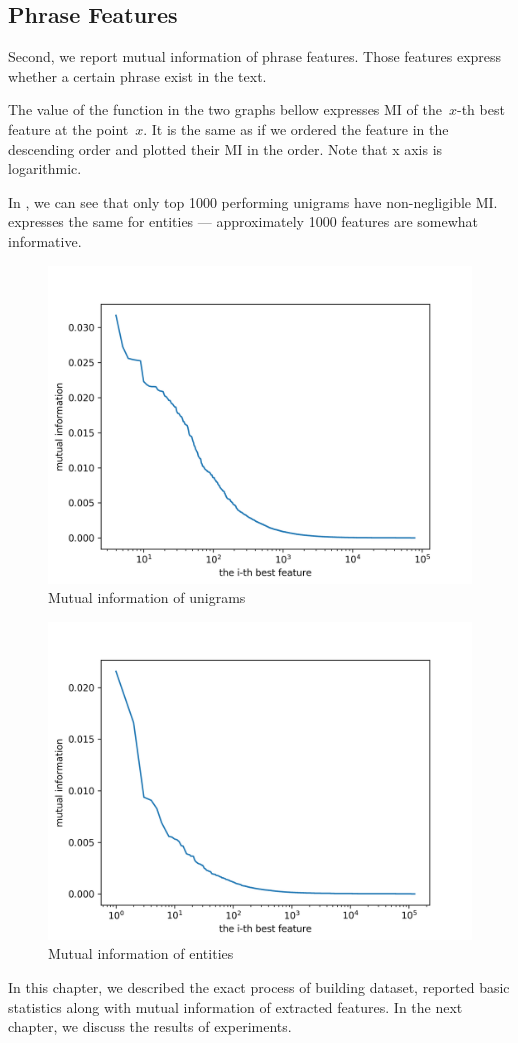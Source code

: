 \subsection{Phrase Features}

Second, we report mutual information of phrase features.
Those features express whether a certain phrase exist in the text.

The value of the function in the two graphs bellow expresses
MI of the~$x$-th best feature at the point~$x$.
It is the same as if we ordered the feature in the descending order
and plotted their MI in the order.
Note that x axis is logarithmic.

In ,
we can see that only top 1000 performing unigrams have non-negligible MI.
 expresses the same for entities
--- approximately 1000 features are somewhat informative.


\begin{figure}[ht]\centering
\includegraphics[width=130mm]{figures/unigrams.png}
\caption{Mutual information of unigrams}\label{fig:mi_unigrams}
\end{figure}


\begin{figure}[ht]\centering
\includegraphics[width=130mm]{figures/entities.png}
\caption{Mutual information of entities}\label{fig:mi_entities}
\end{figure}


In this chapter, we described the exact process of building dataset,
reported basic statistics along with mutual information of extracted features.
In the next chapter, we discuss the results of experiments.
